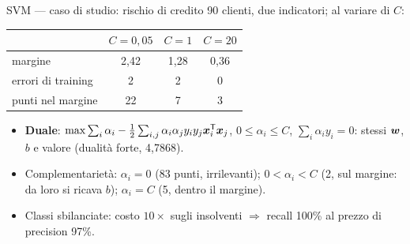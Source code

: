 \documentclass[11pt,aspectratio=169]{beamer}
\begin{document}
\begin{frame}{SVM --- caso di studio: rischio di credito}
90 clienti, due indicatori; al variare di $C$:
\begin{center}\small
\begin{tabular}{lccc}
\toprule
 & $C = 0{,}05$ & $C = 1$ & $C = 20$ \\
\midrule
margine & 2,42 & 1,28 & 0,36 \\
errori di training & 2 & 2 & 0 \\
punti nel margine & 22 & 7 & 3 \\
\bottomrule
\end{tabular}
\end{center}
\begin{itemize}
  \item \textbf{Duale}: $\max \sum_i \alpha_i - \tfrac12 \sum_{i,j} \alpha_i
        \alpha_j y_i y_j \boldsymbol{x}_i^{\mathsf T} \boldsymbol{x}_j$, $0 \le \alpha_i \le C$,
        $\sum_i \alpha_i y_i = 0$: stessi $\boldsymbol{w}$, $b$ e valore (dualità forte,
        4,7868).
  \item Complementarietà: $\alpha_i = 0$ (83 punti, irrilevanti);
        $0 < \alpha_i < C$ (2, \alert{sul margine}: da loro si ricava $b$);
        $\alpha_i = C$ (5, dentro il margine).
  \item Classi sbilanciate: costo $10\times$ sugli insolventi $\Rightarrow$
        recall 100\% al prezzo di precision 97\%.
\end{itemize}
\end{frame}
\end{document}
